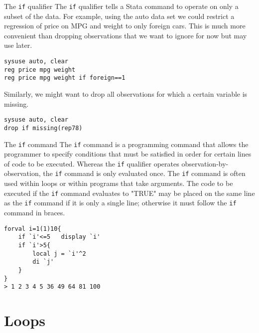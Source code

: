 \documentclass[fleqn, handout, 10pt]{beamer}
\def\lst{\lstinline}
\begin{document}
\begin{frame}[fragile]{The \lst=if= qualifier}
    The \lst=if= qualifier tells a Stata command to operate on only a subset of the data. For example, using the auto data set we could restrict a regression of price on MPG and weight to only foreign cars. This is much more convenient than dropping observations that we want to ignore for now but may use later. \pause
    \begin{lstlisting}
sysuse auto, clear
reg price mpg weight
reg price mpg weight if foreign==1
    \end{lstlisting} \pause
    Similarly, we might want to drop all observations for which a certain variable is missing. \pause
    \begin{lstlisting}
sysuse auto, clear
drop if missing(rep78)
    \end{lstlisting}
\end{frame}

\begin{frame}[fragile]{The \lst=if= command}
    The \lst=if= command is a programming command that allows the programmer to specify conditions that must be satisfied in order for certain lines of code to be executed. Whereas the \lst=if= qualifier operates observation-by-observation, the \lst=if= command is only evaluated once. The \lst=if= command is often used within loops or within programs that take arguments. The code to be executed if the \lst=if= command evaluates to "TRUE" may be placed on the same line as the \lst-if- command if it is only a single line; otherwise it must follow the \lst=if= command in braces.

    \begin{lstlisting}
forval i=1(1)10{
    if `i'<=5	display `i'
    if `i'>5{
        local j = `i'^2
        di `j'
    }
}
> 1 2 3 4 5 36 49 64 81 100
    \end{lstlisting}
\end{frame}


\section{Loops}
\end{document}
